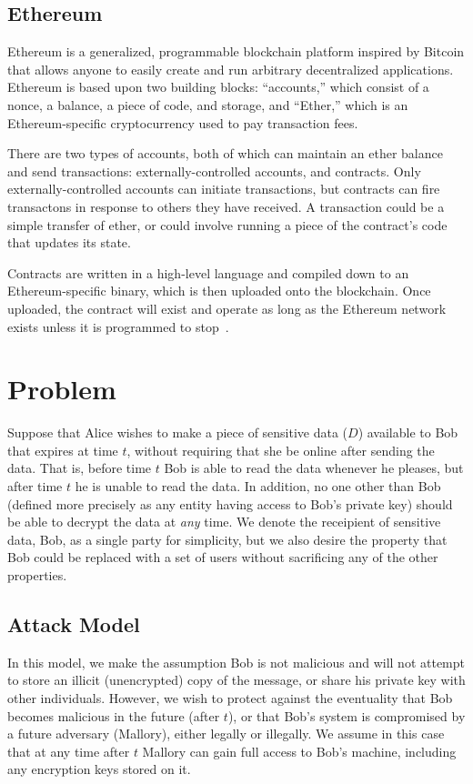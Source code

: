 \documentclass{article}
\begin{document}
\subsection{Ethereum}

Ethereum is a generalized, programmable blockchain platform inspired by Bitcoin that allows anyone to easily create and run arbitrary decentralized applications. Ethereum is based upon two building blocks: ``accounts,'' which consist of a nonce, a balance, a piece of code, and storage, and ``Ether,'' which is an Ethereum-specific cryptocurrency used to pay transaction fees.

There are two types of accounts, both of which can maintain an ether balance and send  transactions: externally-controlled accounts, and contracts. Only externally-controlled accounts can initiate transactions, but contracts can fire transactons in response to others they have received. A transaction could be a simple transfer of ether, or could involve running a piece of the contract's code that updates its state.

Contracts are written in a high-level language and compiled down to an Ethereum-specific binary, which is then uploaded onto the blockchain. Once uploaded, the contract will exist and operate as long as the Ethereum network exists unless it is programmed to stop~\cite{ethereum-white}.

\section{Problem}

Suppose that Alice wishes to make a piece of sensitive data ($D$) available to Bob that expires at time $t$, without requiring that she be online after sending the data. That is, before time $t$ Bob is able to read the data whenever he pleases, but after time $t$ he is unable to read the data. In addition, no one other than Bob (defined more precisely as any entity having access to Bob's private key) should be able to decrypt the data at \textit{any} time. We denote the receipient of sensitive data, Bob, as a single party for simplicity, but we also desire the property that Bob could be replaced with a set of users without sacrificing any of the other properties.

\subsection{Attack Model}

In this model, we make the assumption Bob is not malicious and will not attempt to store an illicit (unencrypted) copy of the message, or share his private key with other individuals. However, we wish to protect against the eventuality that Bob becomes malicious in the future (after $t$), or that Bob's system is compromised by a future adversary (Mallory), either legally or illegally. We assume in this case that at any time after $t$ Mallory can gain full access to Bob's machine, including any encryption keys stored on it.
\end{document}
